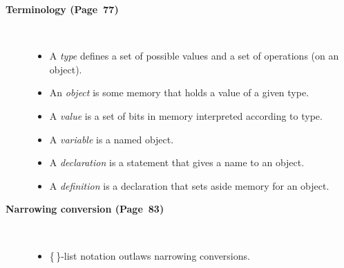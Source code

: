 \documentclass[12pt]{article}
\begin{document}
\begin{description}

	\item [\textbf{Terminology (Page~77)}]\
		\begin{itemize}
			\item A \emph{type} defines a set of possible values and a set of operations (on an object).
			\item An \emph{object} is some memory that holds a value of a given type.
			\item A \emph{value} is a set of bits in memory interpreted according to type.
			\item A \emph{variable} is a named object.
			\item A \emph{declaration} is a statement that gives a name to an object.
			\item A \emph{definition} is a declaration that sets aside memory for an object.
		\end{itemize}

	\item [\textbf{Narrowing conversion (Page~83)}]\
		\begin{itemize}
			\item \{\,\}-list notation outlaws narrowing conversions.
		\end{itemize}

\end{description}
\end{document}

